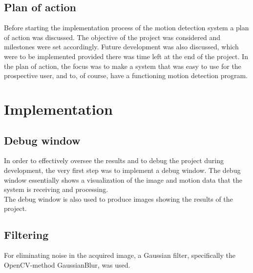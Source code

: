 \documentclass[10pt,a4paper, singlespace]{article}
\begin{document}
\subsection{Plan of action}
Before starting the implementation process of the motion detection system a plan of action was discussed. The objective of the project was considered and milestones were set accordingly. Future development was also discussed, which were to be implemented provided there was time left at the end of the project. In the plan of action, the focus was to make a system that was easy to use for the prospective user, and to, of course, have a functioning motion detection program.

\section{Implementation}


\subsection{Debug window}

In order to effectively oversee the results and to debug the project during development, the very first step was to implement a debug window. The debug window essentially shows a visualization of the image and motion data that the system is receiving and processing.\\
The debug window is also used to produce images showing the results of the project.\\
\subsection{Filtering}

For eliminating noise in the acquired image, a Gaussian filter, specifically the OpenCV-method GaussianBlur, was used.
\end{document}
